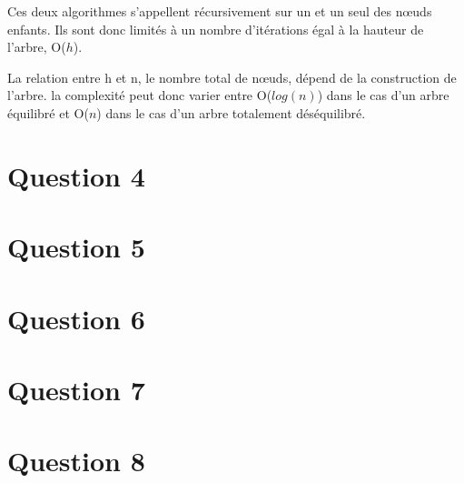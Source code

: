 \documentclass[10pt,a4paper]{article}
\begin{document}
	Ces deux algorithmes s'appellent récursivement sur un et un seul des nœuds enfants. Ils sont donc limités à un nombre d'itérations égal à la hauteur de l'arbre, O($h$).
	
	La relation entre h et n, le nombre total de nœuds, dépend de la construction de l'arbre. la complexité peut donc varier entre O($log(n)$) dans le cas d'un arbre équilibré et O($n$) dans le cas d'un arbre totalement déséquilibré.
	
\section*{Question 4}
\section*{Question 5}
\section*{Question 6}
\section*{Question 7}
\section*{Question 8}
\end{document}
